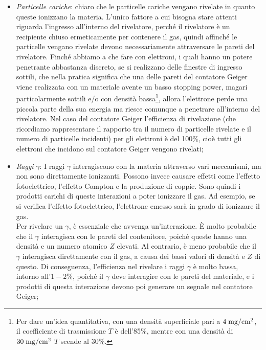 \begin{itemize}[leftmargin=0.5cm]
   \item \textit{Particelle cariche}: \E chiaro che le particelle cariche vengano rivelate in quanto queste ionizzano la materia. L'unico fattore a cui bisogna stare attenti riguarda l'ingresso all'interno del rivelatore, perché il rivelatore è un recipiente chiuso ermeticamente per contenere il gas, quindi affinché le particelle vengano rivelate devono necessariamente attraversare le pareti del rivelatore. Finché abbiamo a che fare con elettroni, i quali hanno un potere penetrante abbastanza discreto, se si realizzano delle finestre di ingresso sottili, che nella pratica significa che una delle pareti del contatore Geiger viene realizzata con un materiale avente un basso stopping power, magari particolarmente sottili e/o con densità bassa\footnote{Per dare un'idea quantitativa, con una densità superficiale pari a $4 \; \rm mg/cm^2$, il coefficiente di trasmissione $T$ è dell'85\%, mentre con una densità di $30 \; \rm mg/cm^2$ $T$ scende al 30\%.}, allora l'elettrone perde una piccola parte della sua energia ma riesce comunque a penetrare all'interno del rivelatore. Nel caso del contatore Geiger l'efficienza di rivelazione (che ricordiamo rappresentare il rapporto tra il numero di particelle rivelate e il numero di particelle incidenti) per gli elettroni è del 100\%, cioè tutti gli elettroni che incidono sul contatore Geiger vengono rivelati;
   \item \textit{Raggi} $\gamma$: I raggi $\gamma$ interagiscono con la materia attraverso vari meccanismi, ma non sono direttamente ionizzanti. Possono invece causare effetti come l'effetto fotoelettrico, l'effetto Compton e la produzione di coppie. Sono quindi i prodotti carichi di queste interazioni a poter ionizzare il gas. Ad esempio, se si verifica l'effetto fotoelettrico, l'elettrone emesso sarà in grado di ionizzare il gas.\\
   Per rivelare un $\gamma$, è essenziale che avvenga un'interazione. È molto probabile che il $\gamma$ interagisca con le pareti del contenitore, poiché queste hanno una densità e un numero atomico $Z$ elevati. Al contrario, è meno probabile che il $\gamma$ interagisca direttamente con il gas, a causa dei bassi valori di densità e $Z$ di questo. Di conseguenza, l'efficienza nel rivelare i raggi $\gamma$ è molto bassa, intorno all'$1-2\%$, poiché il $\gamma$ deve interagire con le pareti del materiale, e i prodotti di questa interazione devono poi generare un segnale nel contatore Geiger;
\end{itemize}
